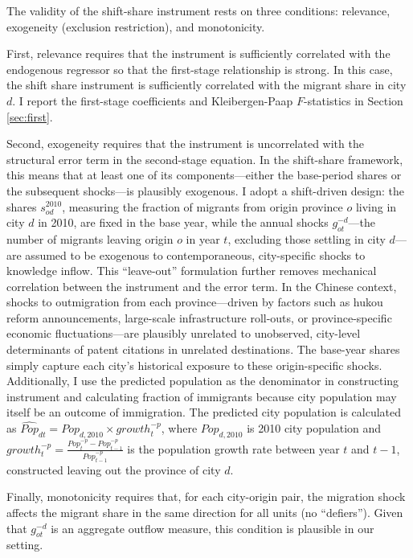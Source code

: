 \documentclass[12pt]{article}
\begin{document}
The validity of the shift-share instrument rests on three conditions: relevance, exogeneity (exclusion restriction), and monotonicity.

First, relevance requires that the instrument is sufficiently correlated with the endogenous regressor so that the first-stage relationship is strong. In this case, the shift share instrument is sufficiently correlated with the migrant share in city $d$. I report the first-stage coefficients and Kleibergen-Paap $F$-statistics in Section \ref{sec:first}.

Second, exogeneity requires that the instrument is uncorrelated with the structural error term in the second-stage equation. In the shift-share framework, this means that at least one of its components—either the base-period shares or the subsequent shocks—is plausibly exogenous. I adopt a shift-driven design: the shares $s^{2010}_{od}$, measuring the fraction of migrants from origin province $o$ living in city $d$ in 2010, are fixed in the base year, while the annual shocks $g^{-d}_{ot}$—the number of migrants leaving origin $o$ in year $t$, excluding those settling in city $d$—are assumed to be exogenous to contemporaneous, city-specific shocks to knowledge inflow. This “leave-out” formulation further removes mechanical correlation between the instrument and the error term. In the Chinese context, shocks to outmigration from each province—driven by factors such as hukou reform announcements, large-scale infrastructure roll-outs, or province-specific economic fluctuations—are plausibly unrelated to unobserved, city-level determinants of patent citations in unrelated destinations. The base-year shares simply capture each city's historical exposure to these origin-specific shocks. Additionally, I use the predicted population as the denominator in constructing instrument and calculating fraction of immigrants because city population may itself be an outcome of immigration. The predicted city population is calculated as $\hat{Pop}_{dt}=Pop_{d,2010} \times growth_t^{-p}$, where $Pop_{d,2010}$ is 2010 city population and $growth_t^{-p}=\frac{Pop_t^{-p}-Pop_{t-1}^{-p}}{Pop_{t-1}^{-p}}$ is the population growth rate between year $t$ and $t-1$, constructed leaving out the province of city $d$.

Finally, monotonicity requires that, for each city-origin pair, the migration shock affects the migrant share in the same direction for all units (no “defiers”). Given that $g^{-d}_{ot}$ is an aggregate outflow measure, this condition is plausible in our setting.
\end{document}

